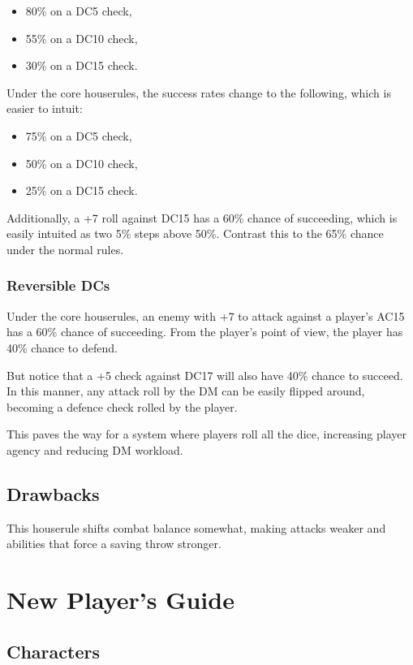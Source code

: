 \documentclass[letterpaper,twocolumn,openany,nodeprecatedcode,bg=print]{dndbook}
\begin{document}
\begin{itemize}
\item 80\% on a DC5 check,
\item 55\% on a DC10 check,
\item 30\% on a DC15 check.
\end{itemize}

\noindent Under the core houserules, the success rates change to the following, which is easier to intuit:

\begin{itemize}
\item 75\% on a DC5 check,
\item 50\% on a DC10 check,
\item 25\% on a DC15 check.
\end{itemize}

\noindent Additionally, a +7 roll against DC15 has a 60\% chance of succeeding, which is easily intuited as two 5\% steps above 50\%. Contrast this to the 65\% chance under the normal rules.

\subsection{Reversible DCs}
Under the core houserules, an enemy with +7 to attack against a player's AC15 has a 60\% chance of succeeding. From the player's point of view, the player has 40\% chance to defend. 

But notice that a +5 check against DC17 will also have 40\% chance to succeed. In this manner, any attack roll by the DM can be easily flipped around, becoming a defence check rolled by the player.

This paves the way for a system where players roll all the dice, increasing player agency and reducing DM workload.

\section{Drawbacks}
This houserule shifts combat balance somewhat, making attacks weaker and abilities that force a saving throw stronger. 





\chapter{New Player's Guide}
\label{new-players-guide}

\newpage
\section{Characters}
\end{document}
